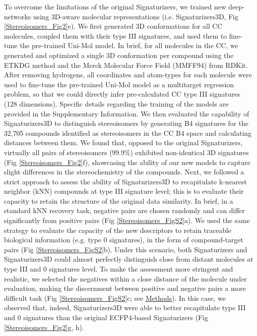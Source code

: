 To overcome the limitations of the original Signaturizers, we trained new deep-networks using 3D-aware molecular representations (i.e. Signaturizers3D, Fig \ref{Stereoisomers_Fig2}e). We first generated 3D conformations for all CC molecules, coupled them with their type III signatures, and used them to fine-tune the pre-trained Uni-Mol model\cite{zhou_uni-mol_2023}. In brief, for all molecules in the CC, we generated and optimized a single 3D conformation per compound using the ETKDG method\cite{riniker_better_2015} and the Merck Molecular Force Field (MMFF94) from RDKit. After removing hydrogens, all coordinates and atom-types for each molecule were used to fine-tune the pre-trained Uni-Mol model as a multitarget regression problem, so that we could directly infer pre-calculated CC type III signatures (128 dimensions). Specific details regarding the training of the models are provided in the Supplementary Information. We then evaluated the capability of Signaturizers3D to distinguish stereoisomers by generating B4 signatures for the 32,705 compounds identified as stereoisomers in the CC B4 space and calculating distances between them. We found that, opposed to the original Signaturizers, virtually all pairs of stereoisomers (99.9\%) exhibited non-identical 3D signatures (Fig \ref{Stereoisomers_Fig2}f), showcasing the ability of our new models to capture slight differences in the stereochemistry of the compounds. Next, we followed a strict approach to assess the ability of Signaturizers3D to recapitulate k-nearest neighbor (kNN) compounds at type III signature level; this is to evaluate their capacity to retain the structure of the original data similarity. In brief, in a standard kNN recovery task, negative pairs are chosen randomly and can differ significantly from positive pairs (Fig \ref{Stereoisomers_FigS2}a). We used the same strategy to evaluate the capacity of the new descriptors to retain traceable biological information (e.g. type 0 signatures), in the form of compound-target pairs (Fig \ref{Stereoisomers_FigS2}b). Under this scenario, both Signaturizers and Signaturizers3D could almost perfectly distinguish close from distant molecules at type III and 0 signatures level. To make the assessment more stringent and realistic, we selected the negatives within a close distance of the molecule under evaluation, making the discernment between positive and negative pairs a more difficult task (Fig \ref{Stereoisomers_FigS2}c; see \hyperref[Stereoisomers_Methods]{Methods}). In this case, we observed that, indeed, Signaturizers3D were able to better recapitulate type III and 0 signatures than the original ECFP4-based Signaturizers (Fig \ref{Stereoisomers_Fig2}g, h).


